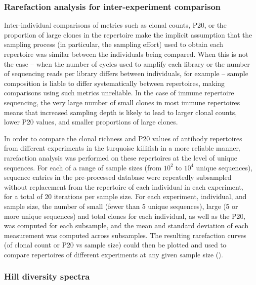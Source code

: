 \subsubsection{Rarefaction analysis for inter-experiment comparison}
\label{sec:methods_comp_igdownstream_rarefaction}

Inter-individual comparisons of metrics such as clonal counts, P20, or the proportion of large clones in the repertoire make the implicit assumption that the sampling process (in particular, the sampling effort) used to obtain each repertoire was similar between the individuals being compared. When this is not the case -- when the number of cycles used to amplify each library or the number of sequencing reads per library differs between individuals, for example -- sample composition is liable to differ systematically between repertoires, making comparisons using such metrics unreliable. In the case of immune repertoire sequencing, the very large number of small clones in most immune repertoires  \parencite{mora2016diversity} means that increased sampling depth is likely to lead to larger clonal counts, lower P20 values, and smaller proportions of large clones.

In order to compare the clonal richness and P20 values of antibody repertoires from different \igseq experiments in the turquoise killifish in a more reliable manner, rarefaction analysis \parencite{gotelli2001rarefaction} was performed on these repertoires at the level of unique sequences. For each of a range of sample sizes (from $10^2$ to $10^4$ unique sequences), sequence entries in the pre-processed  database were repeatedly subsampled without replacement from the repertoire of each individual in each experiment, for a total of 20 iterations per sample size. For each experiment, individual, and sample size, the number of small (fewer than 5 unique sequences), large (5 or more unique sequences) and total clones for each individual, as well as the P20, was computed for each subsample, and the mean and standard deviation of each measurement was computed across subsamples. The resulting rarefaction curves (of clonal count or P20 vs sample size) could then be plotted and used to compare repertoires of different experiments at any given sample size ().

\subsubsection{Hill diversity spectra}
\label{sec:methods_comp_igdownstream_spectra}

